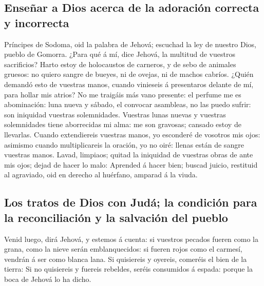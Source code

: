 \hypertarget{enseuxf1ar-a-dios-acerca-de-la-adoraciuxf3n-correcta-y-incorrecta}{%
\subsection{Enseñar a Dios acerca de la adoración correcta y
incorrecta}\label{enseuxf1ar-a-dios-acerca-de-la-adoraciuxf3n-correcta-y-incorrecta}}

 Príncipes de Sodoma, oid la palabra de Jehová; escuchad
la ley de nuestro Dios, pueblo de Gomorra.  ¿Para qué á
mí, dice Jehová, la multitud de vuestros sacrificios? Harto estoy de
holocaustos de carneros, y de sebo de animales gruesos: no quiero sangre
de bueyes, ni de ovejas, ni de machos cabríos.  ¿Quién
demandó esto de vuestras manos, cuando vinieseis á presentaros delante
de mí, para hollar mis atrios?  No me traigáis más vano
presente: el perfume me es abominación: luna nueva y sábado, el convocar
asambleas, no las puedo sufrir: son iniquidad vuestras solemnidades.
 Vuestras lunas nuevas y vuestras solemnidades tiene
aborrecidas mi alma: me son gravosas; cansado estoy de llevarlas.
 Cuando extendiereis vuestras manos, yo esconderé de
vosotros mis ojos: asimismo cuando multiplicareis la oración, yo no
oiré: llenas están de sangre vuestras manos.  Lavad,
limpiaos; quitad la iniquidad de vuestras obras de ante mis ojos; dejad
de hacer lo malo:  Aprended á hacer bien; buscad juicio,
restituid al agraviado, oid en derecho al huérfano, amparad á la viuda.

\hypertarget{los-tratos-de-dios-con-juduxe1-la-condiciuxf3n-para-la-reconciliaciuxf3n-y-la-salvaciuxf3n-del-pueblo}{%
\subsection{Los tratos de Dios con Judá; la condición para la
reconciliación y la salvación del
pueblo}\label{los-tratos-de-dios-con-juduxe1-la-condiciuxf3n-para-la-reconciliaciuxf3n-y-la-salvaciuxf3n-del-pueblo}}

 Venid luego, dirá Jehová, y estemos á cuenta: si
vuestros pecados fueren como la grana, como la nieve serán
emblanquecidos: si fueren rojos como el carmesí, vendrán á ser como
blanca lana.  Si quisiereis y oyereis, comeréis el bien
de la tierra:  Si no quisiereis y fuereis rebeldes,
seréis consumidos á espada: porque la boca de Jehová lo ha dicho.

